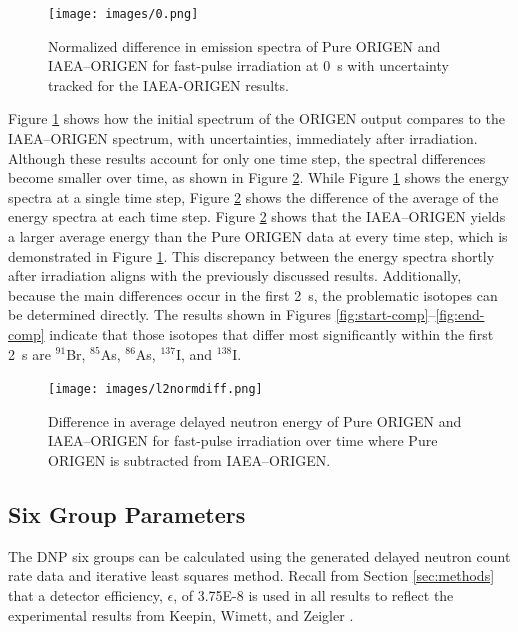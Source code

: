 \documentclass{style/nseJournal}
\begin{document}
\begin{figure}[]
\centering
\texttt{[image: images/0.png]}
\caption{Normalized difference in emission spectra of Pure ORIGEN and IAEA--ORIGEN for  fast-pulse irradiation at 0~s with uncertainty tracked for the IAEA-ORIGEN results.}
\label{fig:net-spec}
\end{figure}

Figure \ref{fig:net-spec} shows how the initial spectrum of the ORIGEN output compares to the IAEA--ORIGEN spectrum, with uncertainties, immediately after irradiation.
Although these results account for only one time step, the spectral differences become smaller over time, as shown in Figure \ref{fig:spec-diff}.
While Figure \ref{fig:net-spec} shows the energy spectra at a single time step, Figure \ref{fig:spec-diff} shows the difference of the average of the energy spectra at each time step.
Figure \ref{fig:spec-diff} shows that the IAEA--ORIGEN yields a larger average energy than the Pure ORIGEN data at every time step, which is demonstrated in Figure \ref{fig:net-spec}.
This discrepancy between the energy spectra shortly after irradiation aligns with the previously discussed results.
Additionally, because the main differences occur in the first 2~s, the problematic isotopes can be determined directly. The results shown in Figures \ref{fig:start-comp}--\ref{fig:end-comp} indicate that those isotopes that differ most significantly within the first 2~s are $^{91}$Br, $^{85}$As, $^{86}$As, $^{137}$I, and $^{138}$I.

\begin{figure}[]
\centering
\texttt{[image: images/l2normdiff.png]}
\caption{Difference in average delayed neutron energy of Pure ORIGEN and IAEA--ORIGEN for  fast-pulse irradiation over time where Pure ORIGEN is subtracted from IAEA--ORIGEN.}
\label{fig:spec-diff}
\end{figure}
\subsection{Six Group Parameters}
\label{sec:sixgroupfit}

The DNP six groups can be calculated using the generated delayed neutron count rate data and iterative least squares method.
Recall from Section \ref{sec:methods} that a detector efficiency, $\epsilon$, of 3.75E-8 is used in all results to reflect the experimental results from Keepin, Wimett, and Zeigler \cite{KEEPIN1957IN2}.
\end{document}
